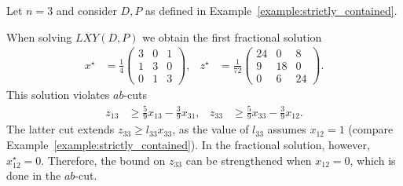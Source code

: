 \begin{example}
\label{example:integral_sol_with_cuts}
	Let $n=3$ and consider $D,P$ as defined in Example~\ref{example:strictly_contained}. 
	
	When solving $LXY(D,P)$ we obtain the first fractional solution 
	\begin{align*}
		x^\star &= \frac{1}{4}
		\begin{pmatrix}
			3&0&1\\
			1&3&0\\
			0&1&3
		\end{pmatrix},&
		z^\star&=\frac{1}{72}
		\begin{pmatrix}
			24&0&8\\
			9&18&0\\
			0&6&24
		\end{pmatrix}.
	\end{align*}
	This solution violates $ab$-cuts
	\begin{align*}
		z_{13}&\geq \frac{5}{9}x_{13} - \frac{3}{9}x_{31},&z_{33}&\geq \frac{5}{9}x_{33} - \frac{3}{9}x_{12}.
	\end{align*}
	The latter cut extends $z_{33}\geq l_{33}x_{33}$, as the value of $l_{33}$ assumes $x_{12}=1$ (compare Example~\ref{example:strictly_contained}). In the fractional solution, however, $x^\star_{12}=0$. Therefore, the bound on $z_{33}$ can be strengthened when $x_{12} = 0$, which is done in the $ab$-cut.
	

\end{example}

